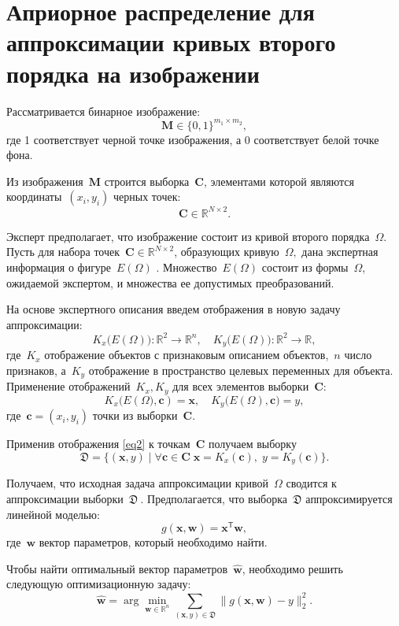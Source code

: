 \section{Априорное распределение для аппроксимации кривых второго порядка на изображении}
Рассматривается бинарное изображение:
\[
\mathbf{M} \in \{0, 1 \}^{m_1\times m_2},
\]
где 1 соответствует черной точке изображения, а 0 соответствует белой точке фона.

Из изображения~$\mathbf{M}$ строится выборка~$\mathbf{C}$, элементами которой являются координаты~$(x_i, y_i)$ черных точек:
\[
\mathbf{C} \in\mathbb{R}^{N \times 2}.
\]

Эксперт предполагает, что изображение состоит из кривой второго порядка~$\Omega$.
Пусть для набора точек~$\mathbf{C}\in\mathbb{R}^{N \times 2}$, образующих кривую~$\Omega,$ дана экспертная информация о фигуре~$E(\Omega)$ .
Множество~$E(\Omega)$ состоит из формы~$\Omega$, ожидаемой экспертом, и множества ее допустимых преобразований.

На основе экспертного описания введем отображения в новую задачу аппроксимации:
\[
\label{eq1}
	K_{x}\bigl(E(\Omega)\bigr): \mathbb{R}^{2} \rightarrow \mathbb{R}^{n}, \quad K_{y}\bigl(E(\Omega)\bigr): \mathbb{R}^{2} \rightarrow \mathbb{R},
\] 
где~$K_{x}$ отображение объектов с признаковым описанием объектов,~$n$ число признаков, а~$K_{y}$ отображение в пространство целевых переменных для объекта. Применение отображений~$K_{x}, K_{y}$ для всех элементов выборки~$\mathbf{C}$:
\[
\label{eq2}
	K_{x}\bigl(E(\Omega\bigr), \mathbf{c}) = \mathbf{x}, \quad  K_{y}\bigl(E(\Omega), \mathbf{c}\bigr) = y,
\]
где~$\mathbf{c} = (x_i, y_i)$ точки из выборки~$\mathbf{C}$.

Применив отображения \eqref{eq2} к точкам~$\mathbf{C}$ получаем выборку
\[
\label{eq4}
    \mathfrak{D} = \{(\mathbf{x}, y) \; | \; \forall \mathbf{c} \in \mathbf{C} \; \mathbf{x} = K_x(\mathbf{c}), \; y = K_y(\mathbf{c}) \}.
\]

Получаем, что исходная задача аппроксимации кривой~$\Omega$ сводится к аппроксимации выборки~$\mathfrak{D}~$. Предполагается, что выборка~$\mathfrak{D}$ аппроксимируется линейной моделью:
\[
	g(\mathbf{x}, \mathbf{w}) = \mathbf{x}^\mathsf{T} \mathbf{w},
\] 
где~$\mathbf{w}$ вектор параметров, который необходимо найти.

Чтобы найти оптимальный вектор параметров~$\hat{\mathbf{w}}$, необходимо решить следующую оптимизационную задачу:
\[
	\hat{\mathbf{w}} = \arg\min_{\mathbf{w}\in\mathbb{R}^n} \sum_{\left(\mathbf{x}, y\right) \in \mathfrak{D}}\|g(\mathbf{x}, \mathbf{w}) - y \|_2^2.
\] 

